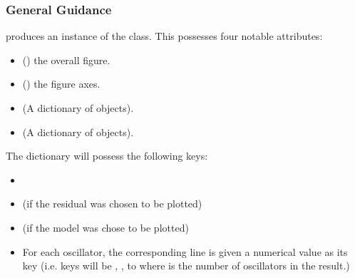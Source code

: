 \documentclass[letterpaper,10pt,english]{sphinxmanual}
\begin{document}
\subsubsection{General Guidance}
\label{\detokenize{misc/figure_customisation:general-guidance}}
\sphinxAtStartPar
{\hyperref[\detokenize{references/core:nmrespy.core.Estimator.plot_result}]{}} produces an instance of the
{\hyperref[\detokenize{references/plot:nmrespy.plot.NmrespyPlot}]{}} class. This possesses four notable
attributes:
\begin{itemize}
\item {} 
\sphinxAtStartPar
{} () the overall figure.

\item {} 
\sphinxAtStartPar
{} () the figure axes.

\item {} 
\sphinxAtStartPar
{} (A dictionary of 
objects).

\item {} 
\sphinxAtStartPar
{} (A dictionary of 
objects).

\end{itemize}

\sphinxAtStartPar
The  dictionary will possess the following keys:
\begin{itemize}
\item {} 
\sphinxAtStartPar
{}

\item {} 
\sphinxAtStartPar
{} (if the residual was chosen to be plotted)

\item {} 
\sphinxAtStartPar
{} (if the model was chose to be plotted)

\item {} 
\sphinxAtStartPar
For each oscillator, the corresponding line is given a numerical value as
its key (i.e. keys will be , , to  where  is the
number of oscillators in the result.)

\end{itemize}
\end{document}
